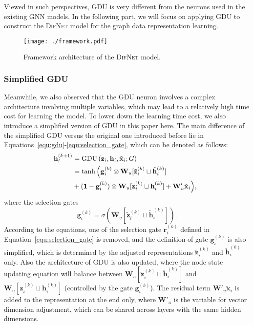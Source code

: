 \documentclass{article}
\newcommand{\mb}{\mathbf}
\newcommand{\our}{\textsc{DifNet}}
\newcommand{\gdu}{\textsc{GDU}}
\begin{document}
Viewed in such perspectives, {\gdu} is very different from the neurons used in the existing GNN models. In the following part, we will focus on applying {\gdu} to construct the {\our} model for the graph data representation learning.

\begin{figure}
    \centering
    \begin{minipage}{.5\textwidth}
    	\texttt{[image: ./framework.pdf]}
     \end{minipage}\caption{Framework architecture of the {\our} model.}
    	\label{fig:framework}
\end{figure}


\subsubsection{Simplified {\gdu}}

Meanwhile, we also observed that the {\gdu} neuron involves a complex architecture involving multiple variables, which may lead to a relatively high time cost for learning the model. To lower down the learning time cost, we also introduce a simplified version of {\gdu} in this paper here. The main difference of the simplified {\gdu} versus the original one introduced before lie in Equations~\ref{equ:gdu}-\ref{equ:selection_gate}, which can be denoted as follows:
\begin{equation}\label{equ:gdu2}
\begin{aligned}
 \hspace{-5pt} \mb{h}_i^{(k+1)}  &= \mbox{GDU}\left(\mb{z}_i, \mb{h}_i, \tilde{\mb{x}}_i; G \right)\\
 &=\tanh \Big( \mb{g}_i^{(k)} \otimes \mb{W}_u  [\tilde{\mb{z}}_i^{(k)} \sqcup \tilde{\mb{h}}_i^{(k)} ]  \\
&+ (\mb{1} - \mb{g}_i^{(k)})  \otimes  \mb{W}_u [\mb{z}_i^{(k)} \sqcup \mb{h}_i^{(k)} ] + \mb{W}'_u \tilde{\mb{x}}_i \Big),
\end{aligned}
\end{equation}
where the selection gates
\begin{equation}\label{equ:selection_gate2}
\mb{g}_i^{(k)}  = \sigma \left( \mb{W}_g \left[ \tilde{\mb{z}}_i^{(k)} \sqcup \tilde{\mb{h}}_i^{(k)} \right] \right).
\end{equation}
According to the equations, one of the selection gate $\mb{r}_i^{(k)}$ defined in Equation~\ref{equ:selection_gate} is removed, and the definition of gate $\mb{g}_i^{(k)}$ is also simplified, which is determined by the adjusted representations $\tilde{\mb{z}}_i^{(k)}$ and $\tilde{\mb{h}}_i^{(k)}$ only. Also the architecture of {\gdu} is also updated, where the node state updating equation will balance between $\mb{W}_u  [\tilde{\mb{z}}_i^{(k)} \sqcup \tilde{\mb{h}}_i^{(k)} ]$ and $\mb{W}_u [\mb{z}_i^{(k)} \sqcup \mb{h}_i^{(k)}]$ (controlled by the gate $\mb{g}_i^{(k)}$). The residual term $\mb{W}'_u \tilde{\mb{x}}_i$ is added to the representation at the end only, where $\mb{W}'_u$ is the variable for vector dimension adjustment, which can be shared across layers with the same hidden dimensions.
\end{document}
